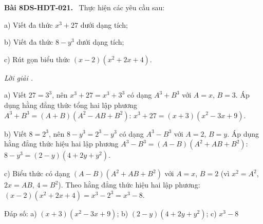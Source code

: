 \documentclass[12pt,a4paper]{article}
\newenvironment{problem}[1][]{\par\medskip\noindent\textbf{Bài #1.}\ }{\par}
\newenvironment{solution}[1][]{\par\noindent\textit{Lời giải #1.}\par}{\par}
\begin{document}
\begin{problem}[8DS-HDT-021]
Thực hiện các yêu cầu sau:

a) Viết đa thức $x^3 + 27$ dưới dạng tích;

b) Viết đa thức $8 - y^3$ dưới dạng tích;

c) Rút gọn biểu thức $(x - 2)(x^2 + 2x + 4)$.

\begin{solution}
a) Viết $27 = 3^3$, nên $x^3 + 27 = x^3 + 3^3$ có dạng $A^3 + B^3$ với $A = x$, $B = 3$. Áp dụng hằng đẳng thức tổng hai lập phương $A^3 + B^3 = (A + B)(A^2 - AB + B^2)$: $x^3 + 27 = (x + 3)(x^2 - 3x + 9)$.

b) Viết $8 = 2^3$, nên $8 - y^3 = 2^3 - y^3$ có dạng $A^3 - B^3$ với $A = 2$, $B = y$. Áp dụng hằng đẳng thức hiệu hai lập phương $A^3 - B^3 = (A - B)(A^2 + AB + B^2)$: $8 - y^3 = (2 - y)(4 + 2y + y^2)$.

c) Biểu thức có dạng $(A - B)(A^2 + AB + B^2)$ với $A = x$, $B = 2$ (vì $x^2 = A^2$, $2x = AB$, $4 = B^2$). Theo hằng đẳng thức hiệu hai lập phương: $(x - 2)(x^2 + 2x + 4) = x^3 - 2^3 = x^3 - 8$.

Đáp số: a) $\boxed{(x + 3)(x^2 - 3x + 9)}$; b) $\boxed{(2 - y)(4 + 2y + y^2)}$; c) $\boxed{x^3 - 8}$
\end{solution}
\end{problem}
\end{document}
